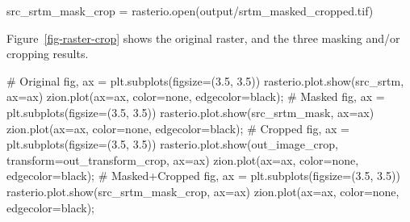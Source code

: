 \documentclass[
  letterpaper,
]{krantz}
\newenvironment{Shaded}{\begin{snugshade}}{\end{snugshade}}
\newcommand{\BuiltInTok}[1]{\textcolor[rgb]{0.00,0.23,0.31}{#1}}
\newcommand{\CommentTok}[1]{\textcolor[rgb]{0.37,0.37,0.37}{#1}}
\newcommand{\FloatTok}[1]{\textcolor[rgb]{0.68,0.00,0.00}{#1}}
\newcommand{\NormalTok}[1]{\textcolor[rgb]{0.00,0.23,0.31}{#1}}
\newcommand{\OperatorTok}[1]{\textcolor[rgb]{0.37,0.37,0.37}{#1}}
\newcommand{\StringTok}[1]{\textcolor[rgb]{0.13,0.47,0.30}{#1}}
\begin{document}
\begin{Shaded}
\begin{Highlighting}[]
\NormalTok{src\_srtm\_mask\_crop }\OperatorTok{=}\NormalTok{ rasterio.}\BuiltInTok{open}\NormalTok{(}\StringTok{\textquotesingle{}output/srtm\_masked\_cropped.tif\textquotesingle{}}\NormalTok{)}
\end{Highlighting}
\end{Shaded}

Figure~\ref{fig-raster-crop} shows the original raster, and the three
masking and/or cropping results.

\begin{Shaded}
\begin{Highlighting}[]
\CommentTok{\# Original}
\NormalTok{fig, ax }\OperatorTok{=}\NormalTok{ plt.subplots(figsize}\OperatorTok{=}\NormalTok{(}\FloatTok{3.5}\NormalTok{, }\FloatTok{3.5}\NormalTok{))}
\NormalTok{rasterio.plot.show(src\_srtm, ax}\OperatorTok{=}\NormalTok{ax)}
\NormalTok{zion.plot(ax}\OperatorTok{=}\NormalTok{ax, color}\OperatorTok{=}\StringTok{\textquotesingle{}none\textquotesingle{}}\NormalTok{, edgecolor}\OperatorTok{=}\StringTok{\textquotesingle{}black\textquotesingle{}}\NormalTok{)}\OperatorTok{;}
\CommentTok{\# Masked}
\NormalTok{fig, ax }\OperatorTok{=}\NormalTok{ plt.subplots(figsize}\OperatorTok{=}\NormalTok{(}\FloatTok{3.5}\NormalTok{, }\FloatTok{3.5}\NormalTok{))}
\NormalTok{rasterio.plot.show(src\_srtm\_mask, ax}\OperatorTok{=}\NormalTok{ax)}
\NormalTok{zion.plot(ax}\OperatorTok{=}\NormalTok{ax, color}\OperatorTok{=}\StringTok{\textquotesingle{}none\textquotesingle{}}\NormalTok{, edgecolor}\OperatorTok{=}\StringTok{\textquotesingle{}black\textquotesingle{}}\NormalTok{)}\OperatorTok{;}
\CommentTok{\# Cropped}
\NormalTok{fig, ax }\OperatorTok{=}\NormalTok{ plt.subplots(figsize}\OperatorTok{=}\NormalTok{(}\FloatTok{3.5}\NormalTok{, }\FloatTok{3.5}\NormalTok{))}
\NormalTok{rasterio.plot.show(out\_image\_crop, transform}\OperatorTok{=}\NormalTok{out\_transform\_crop, ax}\OperatorTok{=}\NormalTok{ax)}
\NormalTok{zion.plot(ax}\OperatorTok{=}\NormalTok{ax, color}\OperatorTok{=}\StringTok{\textquotesingle{}none\textquotesingle{}}\NormalTok{, edgecolor}\OperatorTok{=}\StringTok{\textquotesingle{}black\textquotesingle{}}\NormalTok{)}\OperatorTok{;}
\CommentTok{\# Masked+Cropped}
\NormalTok{fig, ax }\OperatorTok{=}\NormalTok{ plt.subplots(figsize}\OperatorTok{=}\NormalTok{(}\FloatTok{3.5}\NormalTok{, }\FloatTok{3.5}\NormalTok{))}
\NormalTok{rasterio.plot.show(src\_srtm\_mask\_crop, ax}\OperatorTok{=}\NormalTok{ax)}
\NormalTok{zion.plot(ax}\OperatorTok{=}\NormalTok{ax, color}\OperatorTok{=}\StringTok{\textquotesingle{}none\textquotesingle{}}\NormalTok{, edgecolor}\OperatorTok{=}\StringTok{\textquotesingle{}black\textquotesingle{}}\NormalTok{)}\OperatorTok{;}
\end{Highlighting}
\end{Shaded}
\end{document}
